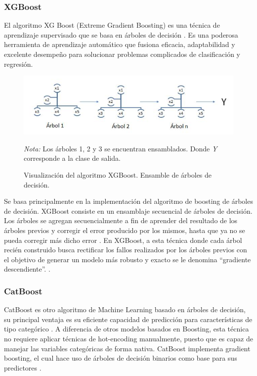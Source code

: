 \documentclass[11pt,a4paper,spanish]{book}
\numberwithin{equation}{chapter}
\numberwithin{figure}{chapter}
\begin{document}
\subsubsection{XGBoost}

El algoritmo XG Boost (Extreme Gradient Boosting) es una técnica de aprendizaje 
supervisado que se basa en árboles de decisión \cite{chen2016xgboost}. 
Es una poderosa herramienta de aprendizaje automático que fusiona eficacia, 
adaptabilidad y excelente desempeño para solucionar problemas complicados de 
clasificación y regresión. 

\begin{figure}[h]
    \caption{Visualización del algoritmo XGBoost. Ensamble de árboles de decisión.
    \protect\cite{salman2024rf}}
    \centering
    \includegraphics[width=1.0\textwidth]{media/xgboost-salman.png}
    \label{fig:figXGBoostSalman}
	\parbox{\textwidth}{\footnotesize \textit{Nota:} Los árboles 1, 2 y 3 se encuentran 
	ensamblados. Donde \textit{Y} corresponde a la clase de salida.}
\end{figure}


Se basa principalmente en la implementación del algoritmo de boosting de árboles de 
decisión. XGBoost consiste en un ensamblaje secuencial de árboles de decisión. 
Los árboles se agregan secuencialmente a fin de aprender del resultado de los árboles 
previos y corregir el error producido por los mismos, hasta que ya no se pueda corregir 
más dicho error \cite{salman2024rf}.  En XGBoost, a esta técnica donde cada árbol recién 
construido busca rectificar los fallos realizados por los árboles previos con el 
objetivo de generar un modelo más robusto y exacto se le denomina “gradiente 
descendiente”. \cite{espinoza2020rf_xgboost}.


\subsubsection{CatBoost}

CatBoost es otro algoritmo de Machine Learning basado en árboles de decisión, su 
principal ventaja es su eficiente capacidad de predicción para características de tipo 
categórico  \cite{ibrahim2020catboost}. A diferencia de otros modelos basados en 
Boosting, esta técnica no requiere aplicar técnicas de hot-encoding manualmente, 
puesto que es capaz de manejar las variables categóricas de forma nativa. CatBoost 
implementa gradient boosting, el cual hace uso de árboles de decisión binarios como 
base para sus predictores \cite{prokhorenkova2018catboost}.
\end{document}
